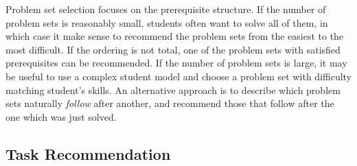 
Problem set selection focuses on the prerequisite structure.
If the number of problem sets is reasonably small, students often want
to solve all of them, in which case it make sense to recommend the problem
sets from the easiest to the most difficult.
If the ordering is not total, one of the problem sets with satisfied prerequisites
can be recommended.
If the number of problem sets is large, it may be useful to use a complex student model
and choose a problem set with difficulty matching student's skills.
An alternative approach is to describe which problem sets naturally \emph{follow} after another,
and recommend those that follow after the one which was just solved.


\subsection{Task Recommendation}  %
\label{sec:task-recommendation}


